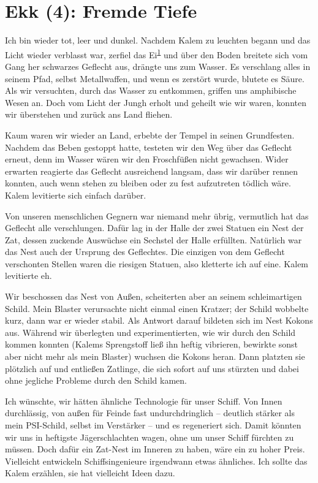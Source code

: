 \documentclass[11pt]{article}
\begin{document}
\section{Ekk (4): Fremde Tiefe}

Ich bin wieder tot, leer und dunkel. Nachdem Kalem zu leuchten begann
und das Licht wieder verblasst war, zerfiel das
Ei\textsuperscript{\href{http://1w6.org/print/book/export/html/59\#fn:kalem-innen}{1}}
und über den Boden breitete sich vom Gang her schwarzes Geflecht aus,
drängte uns zum Wasser. Es verschlang alles in seinem Pfad, selbst
Metallwaffen, und wenn es zerstört wurde, blutete es Säure. Als wir
versuchten, durch das Wasser zu entkommen, griffen uns amphibische Wesen
an. Doch vom Licht der Jungh erholt und geheilt wie wir waren, konnten
wir überstehen und zurück ans Land fliehen.

Kaum waren wir wieder an Land, erbebte der Tempel in seinen Grundfesten.
Nachdem das Beben gestoppt hatte, testeten wir den Weg über das Geflecht
erneut, denn im Wasser wären wir den Froschfüßen nicht gewachsen. Wider
erwarten reagierte das Geflecht ausreichend langsam, dass wir darüber
rennen konnten, auch wenn stehen zu bleiben oder zu fest aufzutreten
tödlich wäre. Kalem levitierte sich einfach darüber.

Von unseren menschlichen Gegnern war niemand mehr übrig, vermutlich hat
das Geflecht alle verschlungen. Dafür lag in der Halle der zwei Statuen
ein Nest der Zat, dessen zuckende Auswüchse ein Sechstel der Halle
erfüllten. Natürlich war das Nest auch der Ursprung des Geflechtes. Die
einzigen von dem Geflecht verschonten Stellen waren die riesigen
Statuen, also kletterte ich auf eine. Kalem levitierte eh.

Wir beschossen das Nest von Außen, scheiterten aber an seinem
schleimartigen Schild. Mein Blaster verursachte nicht einmal einen
Kratzer; der Schild wobbelte kurz, dann war er wieder stabil. Als
Antwort darauf bildeten sich im Nest Kokons aus. Während wir überlegten
und experimentierten, wie wir durch den Schild kommen konnten (Kalems
Sprengstoff ließ ihn heftig vibrieren, bewirkte sonst aber nicht mehr
als mein Blaster) wuchsen die Kokons heran. Dann platzten sie plötzlich
auf und entließen Zatlinge, die sich sofort auf uns stürzten und dabei
ohne jegliche Probleme durch den Schild kamen.

Ich wünschte, wir hätten ähnliche Technologie für unser Schiff. Von
Innen durchlässig, von außen für Feinde fast undurchdringlich --
deutlich stärker als mein PSI-Schild, selbst im Verstärker -- und es
regeneriert sich. Damit könnten wir uns in heftigste Jägerschlachten
wagen, ohne um unser Schiff fürchten zu müssen. Doch dafür ein Zat-Nest
im Inneren zu haben, wäre ein zu hoher Preis. Vielleicht entwickeln
Schiffsingenieure irgendwann etwas ähnliches. Ich sollte das Kalem
erzählen, sie hat vielleicht Ideen dazu.
\end{document}
